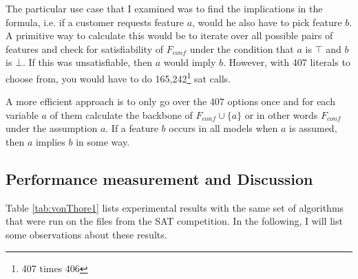 The particular use case that I examined was to find the implications in the formula, i.e. if a customer requests feature $a$, would he also have to pick feature $b$. A primitive way to calculate this would be to iterate over all possible pairs of features 
and check for satisfiability of $F_{conf}$ under the condition that $a$ is $\top$ and $b$ is $\bot$. If this was unsatisfiable, then $a$ would imply $b$. However, with 407 literals to choose from, you would have to do 165,242\footnote{407 times 406} sat calls. 

A more efficient approach is to only go over the 407 options once and for each variable $a$ of them calculate the backbone of $F_{conf} \cup \{a\}$ or in other words $F_{conf}$ under the assumption $a$. If a feature $b$ occurs in all models when $a$ is assumed, then $a$ implies $b$ in some way.


\subsection{Performance measurement and Discussion}
Table \ref{tab:vonThore1} lists experimental results with the same set of algorithms that were run on the files from the SAT competition. In the following, I will list some observations about these results.

